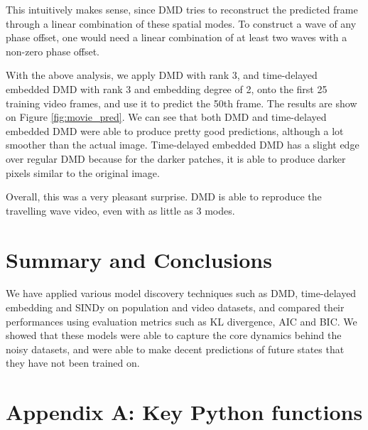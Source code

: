 \documentclass[letterpaper, 10 pt, conference]{ieeeconf}  %
\begin{document}
This intuitively makes sense, since DMD tries to reconstruct the predicted frame through a linear combination of these spatial modes. To construct a wave of any phase offset, one would need a linear combination of at least two waves with a non-zero phase offset.

With the above analysis, we apply DMD with rank 3, and time-delayed embedded DMD with rank 3 and embedding degree of 2, onto the first 25 training video frames, and use it to predict the 50th frame.
The results are show on Figure \ref{fig:movie_pred}. We can see that both DMD and time-delayed embedded DMD were able to produce pretty good predictions, although a lot smoother than the actual image. Time-delayed embedded DMD has a slight edge over regular DMD because for the darker patches, it is able to produce darker pixels similar to the original image. 

Overall, this was a very pleasant surprise. DMD is able to reproduce the travelling wave video, even with as little as 3 modes.

\section{Summary and Conclusions}
We have applied various model discovery techniques such as DMD, time-delayed embedding and SINDy on population and video datasets, and compared their performances using evaluation metrics such as KL divergence, AIC and BIC. We showed that these models were able to capture the core dynamics behind the noisy datasets, and were able to make decent predictions of future states that they have not been trained on.



\clearpage

\onecolumn
\section*{Appendix A: Key Python functions}
\end{document}
